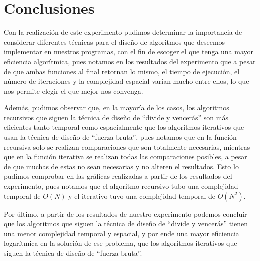 \section{Conclusiones}
Con la realización de este experimento pudimos determinar la importancia de considerar diferentes técnicas para el diseño de algoritmos que deseemos implementar en nuestros programas, con el fin de escoger el que tenga una mayor eficiencia algorítmica, pues notamos en los resultados del experimento que a pesar de que ambas funciones al final retornan lo mismo, el tiempo de ejecución, el número de iteraciones y la complejidad espacial varían mucho entre ellos, lo que nos permite elegir el que mejor nos convenga. 

Además, pudimos observar que, en la mayoría de los casos, los algoritmos recursivos que siguen la técnica de diseño de “divide y vencerás” son más eficientes tanto temporal como espacialmente que los algoritmos iterativos que usan la técnica de diseño de “fuerza bruta”, pues notamos que en la función recursiva solo se realizan comparaciones que son totalmente necesarias, mientras que en la función iterativa se realizan todas las comparaciones posibles, a pesar de que muchas de estas no sean necesarias y no alteren el resultados.  Esto lo pudimos comprobar en las gráficas realizadas a partir de los resultados del experimento, pues notamos que el algoritmo recursivo tubo una complejidad temporal de $O(N)$ y el iterativo tuvo una complejidad temporal de $O(N^2)$.

Por último, a partir de los resultados de nuestro experimento podemos concluir que los algoritmos que siguen la técnica de diseño de “divide y vencerás” tienen una menor complejidad temporal y espacial, y por ende una mayor eficiencia logarítmica en la solución de ese problema, que los algoritmos iterativos que siguen la técnica de diseño de “fuerza bruta”. 